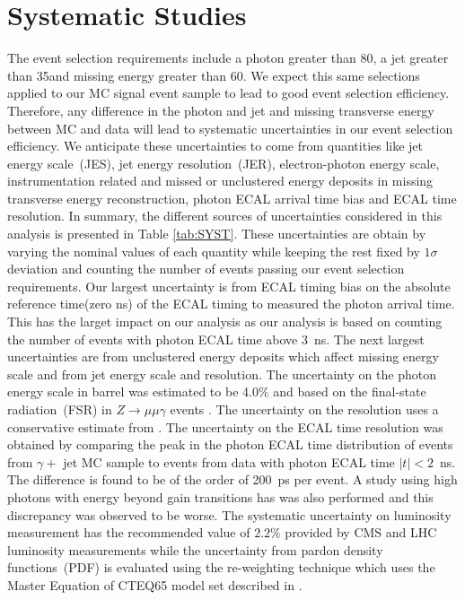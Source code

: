 \section{Systematic Studies}
The event selection requirements include a photon \pt greater than 80\GeVc, a jet \pt greater than 35\GeVc and missing energy greater than 60\GeV. We expect this same selections applied to our MC signal event sample to lead to good event selection efficiency. Therefore, any difference in the photon and jet \pt and missing transverse energy between MC and data will lead to systematic uncertainties in our event selection efficiency. We anticipate these uncertainties to come from quantities like jet energy scale~(JES), jet energy resolution~(JER), electron-photon energy scale, instrumentation related and missed or unclustered energy deposits in missing transverse energy reconstruction, photon ECAL arrival time bias and ECAL time resolution. In summary, the different sources of uncertainties considered in this analysis is presented in Table \ref{tab:SYST}. These uncertainties are obtain by varying the nominal values of each quantity while keeping the rest fixed by $1\sigma$ deviation and counting the number of events passing our event selection requirements. Our largest uncertainty is from ECAL timing bias on the absolute reference time(zero ns) of the ECAL timing to measured the photon arrival time. This has the larget impact on our analysis as our analysis is based on counting the number of events with photon ECAL time above $3$~ns. The next largest uncertainties are from unclustered energy deposits which affect missing energy scale and from jet energy scale and resolution.
\newline
The uncertainty on the photon energy scale in barrel was estimated to be 4.0\% and based on the final-state radiation~(FSR) in $Z\rightarrow \mu\mu\gamma$ events \cite{PES}.  The uncertainty on the \MET resolution uses a conservative estimate from \cite{METRES}. The uncertainty on the ECAL time resolution was obtained by comparing the peak in the photon ECAL time distribution of events from $\gamma +$ jet MC sample to events from data with photon ECAL time $|t| < 2$~ns. The difference is found to be of the order of 200~ps per event. A study using high \pt photons with energy beyond gain transitions has was also performed and this discrepancy was observed to be worse. 
The systematic uncertainty on luminosity measurement has the recommended value of $2.2$\% provided by CMS and LHC luminosity measurements while the uncertainty from pardon density functions~(PDF) is evaluated using the re-weighting technique which uses the Master Equation of CTEQ65 model set described in \cite{PDF}.
